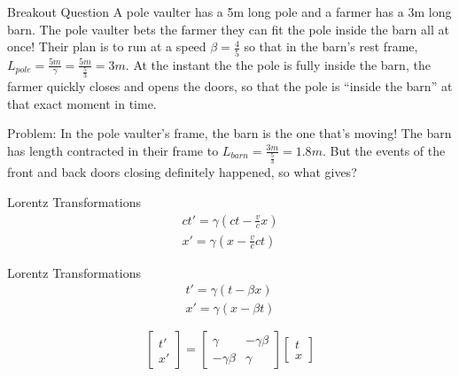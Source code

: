 \documentclass[10pt,xcolor={table,dvipsnames},t]{beamer}
\begin{document}
\begin{frame}{Breakout Question}
 A pole vaulter has a 5m long pole and a farmer has a 3m long barn. The pole vaulter bets the farmer they can fit the pole inside the barn all at once! Their plan is to run at a speed $\beta = \frac{4}{5}$ so that in the barn's rest frame, $L_{pole} = \frac{5m}{\gamma} = \frac{5m}{\frac{5}{3}} = 3m$. At the instant the the pole is fully inside the barn, the farmer quickly closes and opens the doors, so that the pole is ``inside the barn'' at that exact moment in time.
 
 \vspace{10pt}
 
 Problem: In the pole vaulter's frame, the barn is the one that's moving! The barn has length contracted in their frame to $L_{barn} = \frac{3m}{\frac{5}{3}} = 1.8m$. But the events of the front and back doors closing definitely happened, so what gives?


\end{frame}

\begin{frame}{Lorentz Transformations}
    \begin{align*}
        ct' = \gamma(ct - \frac{v}{c} x) \\
        x' = \gamma(x - \frac{v}{c} ct)
    \end{align*}
\end{frame}

\begin{frame}{Lorentz Transformations}
    \begin{align*}
        t' = \gamma(t - \beta x) \\
        x' = \gamma(x - \beta t)
    \end{align*}
    
    \begin{equation*}
        \begin{bmatrix}t' \\ x' \end{bmatrix} = \begin{bmatrix}\gamma & -\gamma \beta \\ -\gamma \beta & \gamma  \end{bmatrix} \begin{bmatrix}t \\ x \end{bmatrix}
    \end{equation*}
\end{frame}
\end{document}
